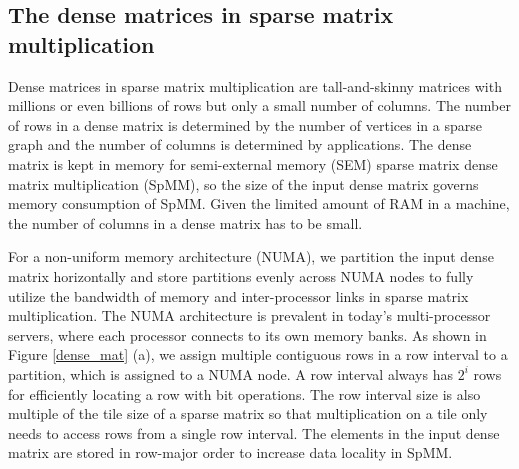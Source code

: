 \subsection{The dense matrices in sparse matrix multiplication}
Dense matrices in sparse matrix multiplication are tall-and-skinny matrices
with millions or even billions of rows but only a small number of columns.
The number of rows in a dense matrix is determined by the number of vertices
in a sparse graph and the number of columns is determined by applications.
The dense matrix is kept in memory for semi-external memory (SEM) sparse matrix
dense matrix multiplication (SpMM),
so the size of the input dense matrix governs memory consumption
of SpMM. Given the limited amount of RAM in a machine, the number of columns
in a dense matrix has to be small.

For a non-uniform memory architecture (NUMA), we partition the input dense matrix
horizontally and store partitions evenly across NUMA nodes to fully utilize
the bandwidth of memory and inter-processor links in sparse matrix
multiplication. The NUMA architecture is prevalent in today's multi-processor
servers, where each processor connects to its own memory banks. As shown in
Figure \ref{dense_mat} (a), we assign multiple
contiguous rows in a row interval to a partition, which is assigned to a NUMA
node. A row interval always has $2^i$ rows for efficiently locating a row
with bit operations. The row interval size is also multiple of the tile size of
a sparse matrix so that multiplication on a tile only needs to access rows
from a single row interval. The elements in the input dense matrix are stored
in row-major order to increase data locality in SpMM.

